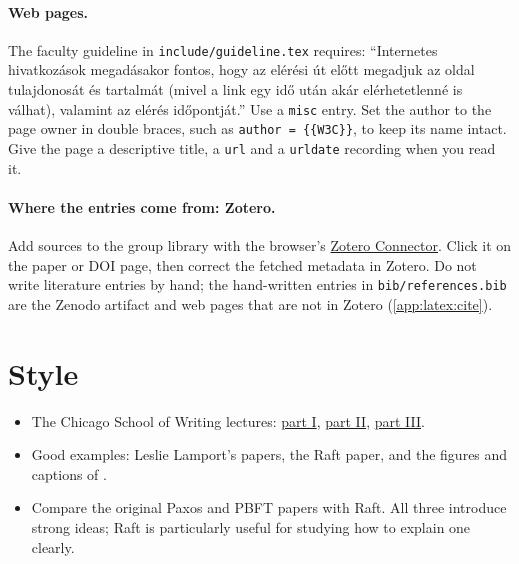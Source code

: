 \paragraph{Web pages.} The faculty guideline in \texttt{include/guideline.tex} requires: \enquote{Internetes hivatkozások megadásakor fontos, hogy az elérési út előtt megadjuk az oldal tulajdonosát és tartalmát (mivel a link egy idő után akár elérhetetlenné is válhat), valamint az elérés időpontját.} Use a \texttt{misc} entry. Set the author to the page owner in double braces, such as \texttt{author = \{\{W3C\}\}}, to keep its name intact. Give the page a descriptive title, a \texttt{url} and a \texttt{urldate} recording when you read it.

\paragraph{Where the entries come from: Zotero.} Add sources to the group library with the browser's \href{https://www.zotero.org/download/connectors}{Zotero Connector}. Click it on the paper or DOI page, then correct the fetched metadata in Zotero. Do not write literature entries by hand; the hand-written entries in \texttt{bib/references.bib} are the Zenodo artifact and web pages that are not in Zotero (\cref{app:latex:cite}).

\section{Style}
\begin{itemize}
  \item The Chicago School of Writing lectures: \href{https://www.youtube.com/watch?v=vtIzMaLkCaM}{part I}, \href{https://www.youtube.com/watch?v=aFwVf5a3pZM}{part II}, \href{https://www.youtube.com/watch?v=gphdfSwYMWU}{part III}.
  \item Good examples: Leslie Lamport's papers, the Raft paper, and the figures and captions of \citet{guide:gulyas2015navigable}.
  \item Compare the original Paxos and PBFT papers with Raft. All three introduce strong ideas; Raft is particularly useful for studying how to explain one clearly.
\end{itemize}

